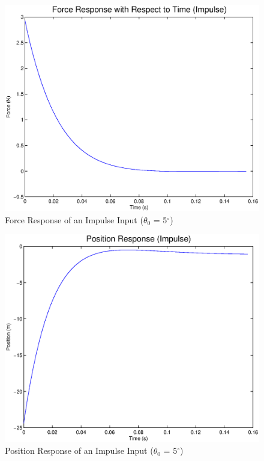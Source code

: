 \documentclass{article}
\begin{document}
\begin{figure}[!htb]
    \centering
    \includegraphics[scale=0.6]{4}
    \caption{Force Response of an Impulse Input ($\theta_0$ = 5$^{\circ}$)}
\end{figure} 

\begin{figure}[!htb]
    \centering
    \includegraphics[scale=0.6]{5}
    \caption{Position Response of an Impulse Input ($\theta_0$ = 5$^{\circ}$)}
\end{figure} 
\end{document}
